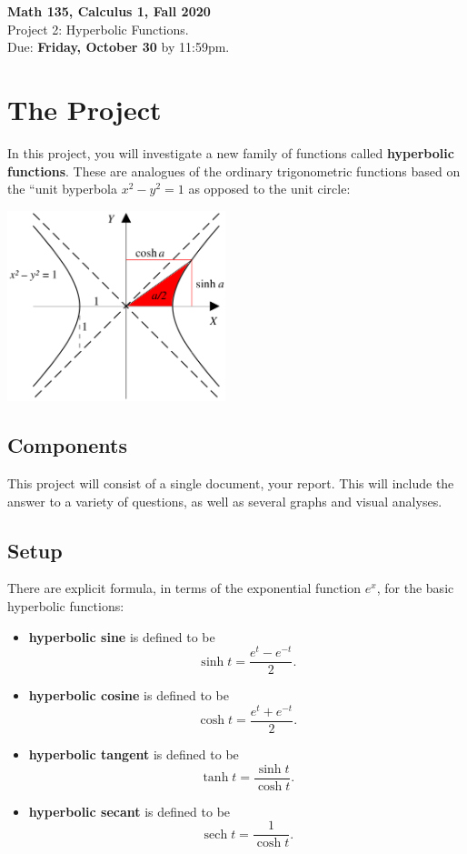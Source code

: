 \documentclass[11pt,reqno,final]{amsart}
\numberwithin{equation}{section}
\numberwithin{figure}{section}
\theoremstyle{definition} %
\DeclareMathOperator{\sech}{sech}
\begin{document}
\onehalfspacing

\begin{center}
        \textbf{\Large Math 135, Calculus 1, Fall 2020}\\[10pt]
        {\large Project 2: Hyperbolic Functions.}\\
        Due: \textbf{Friday, October 30} by 11:59pm.
\end{center}

\thispagestyle{empty}

\renewcommand{\thesection}{\Alph{section}}


\section*{The Project}

In this project, you will investigate a new family of functions called \textbf{hyperbolic functions}.
These are analogues of the ordinary trigonometric functions
based on the ``unit byperbola $x^2 - y^2 = 1$ as opposed to the unit circle:
\begin{center}
        \includegraphics[width=2.5in]{hyp.png}
\end{center}

\subsection*{Components}

This project will consist of a single document, your report.
This will include the answer to a variety of questions, as well as several graphs and visual analyses.

\subsection*{Setup}

There are explicit formula, in terms of the exponential function $e^x$, for the basic hyperbolic functions:
\begin{itemize}
\item \textbf{hyperbolic sine} is defined to be
        \[
                \sinh t = \dfrac{e^t - e^{-t}}{2}.
        \]
\item \textbf{hyperbolic cosine} is defined to be
        \[
                \cosh t = \dfrac{e^t + e^{-t}}{2}.
        \]
\item \textbf{hyperbolic tangent} is defined to be
        \[
                \tanh t = \dfrac{\sinh t}{\cosh t}.
        \]
\item \textbf{hyperbolic secant} is defined to be
        \[
                \sech t = \dfrac{1}{\cosh t}.
        \]        
\end{itemize}
\end{document}
